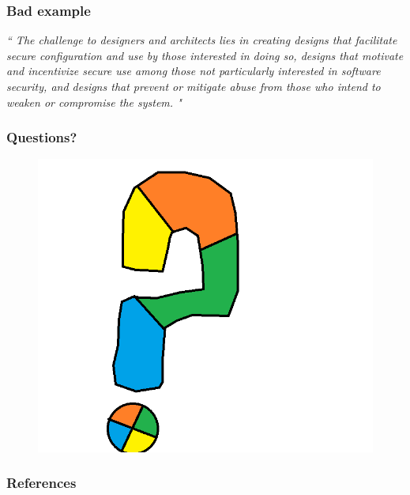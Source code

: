 \documentclass[12pt,norsk]{beamer}
\begin{document}
\begin{frame}
\frametitle{Bad example}

\textit{ `` The challenge to designers and architects lies in creating designs that facilitate secure configuration and use by those interested in doing so, designs that motivate and incentivize secure use among those not particularly interested in software security, and designs that prevent or mitigate abuse from those who intend to weaken or compromise the system. "}

\end{frame}

\begin{frame}

	\frametitle{Questions?}
		

	\begin{figure}[h]
    	\centering
    	\includegraphics[scale=0.45]{images/questionmark.png}
    
	\end{figure}

\end{frame}


\begin{frame}

	\frametitle{References}
		
	
		

\end{frame}




\end{document}
